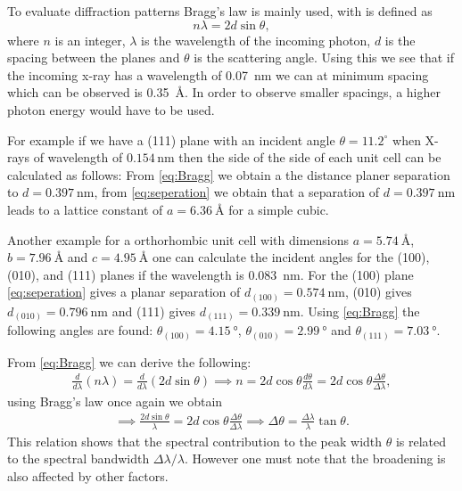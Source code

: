 To evaluate diffraction patterns Bragg's law is mainly used, with is defined as
\begin{equation}
    n\lambda=2d\sin \theta,
    \label{eq:Bragg}
\end{equation}
where $n$ is an integer, $\lambda$ is the wavelength of the incoming photon, $d$ is the spacing between the planes and $\theta$ is the scattering angle. Using this we see that if the incoming x-ray has a wavelength of \SI{0.07}{\nano\m} we can at minimum spacing which can be observed is \SI{0.35}{\angstrom}. In order to observe smaller spacings, a higher photon energy would have to be used. 

For example if we have a (111) plane with an  incident angle \( \theta = 11.2^\circ \) when X-rays of wavelength of \( 0.154 \, \text{nm} \) then the side of the side of each unit cell can be calculated as follows: From \autoref{eq:Bragg} we obtain a the distance planer separation to $d=\SI{0.397}{\nano\m}$, from \autoref{eq:seperation} we obtain that a separation of $d=\SI{0.397}{\nano\m}$ leads to a lattice constant of $a=\SI{6.36}{\angstrom}$ for a simple cubic. 

Another example for a orthorhombic unit cell with dimensions $a=\SI{5.74}{\angstrom}$, $b=\SI{7.96}{\angstrom}$ and $c=\SI{4.95}{\angstrom}$ one can calculate the incident angles for the (100), (010), and
(111) planes if the  wavelength is \SI{0.083}{\nano\m}. For the (100) plane \autoref{eq:seperation} gives a planar separation of $d_{(100)}=\SI{0.574}{\nano\m}$, (010) gives $d_{(010)}=\SI{0.796}{\nano\m}$ and (111) gives $d_{(111)}=\SI{0.339}{\nano\m}$. Using \autoref{eq:Bragg} the following angles are found: $\theta_{(100)} = \SI{4.15}{\degree}$, $\theta_{(010)} = \SI{2.99}{\degree}$ and $\theta_{(111)} = \SI{7.03}{\degree}$.

From \autoref{eq:Bragg} we can derive the following:
\begin{align}
    \frac{d}{d\lambda}\left(n\lambda\right)= \frac{d}{d\lambda}\left(2d\sin\theta\right) \implies n=2d\cos\theta \frac{d \theta}{d\lambda} = 2d\cos\theta \frac{\Delta \theta}{\Delta\lambda},
\end{align}
using Bragg's law once again we obtain 
\begin{align}
    \implies \frac{2d\sin\theta}{\lambda} = 2d\cos\theta \frac{\Delta \theta}{\Delta\lambda} \implies \Delta\theta = \frac{\Delta\lambda}{\lambda}\tan\theta.  
    \label{eq:peak_spectrum}
\end{align}
This relation shows that the spectral contribution to the peak width $\theta$ is related to the spectral bandwidth $\Delta\lambda/\lambda$. However one must note that the broadening is also affected by other factors. 

